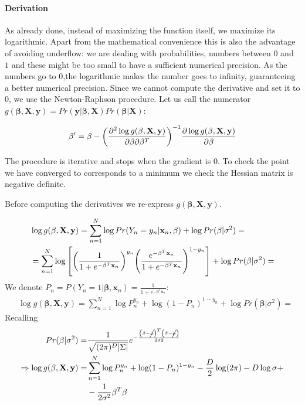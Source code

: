 \documentclass[12pt, letterpaper]{article}
\theoremstyle{definition}
\newcommand{\X}{\mathrm{\mathbf{X}}}
\newcommand{\y}{\mathbf{y}}
\newcommand{\be}{\mathbf{\beta}}
\newcommand{\x}{\mathbf{x}}
\DeclarePairedDelimiter\autobracket{(}{)}
\newcommand{\br}[1]{\autobracket*{#1}}
\begin{document}
\paragraph{Derivation}
As already done, instead of maximizing the function itself, we maximize its logarithmic. Apart from the mathematical convenience this is also the advantage of avoiding underflow: we are dealing with probabilities, numbers between $0$ and $1$ and these might be too small to have a sufficient numerical precision. As the numbers go to $0$,the logarithmic makes the number goes to infinity, guaranteeing a better numerical precision.
 Since we cannot compute the derivative and set it to $0$, we use the Newton-Raphson procedure. Let us call the numerator $g(\be,\X,\y) = Pr(\y|\be,\X)Pr(\be|\X)$:

\begin{equation}
\be' = \be - \br{\frac{\partial^2\log g(\be,\X,\y)}{\partial \be \partial \be^T}}^{-1} \frac{\partial \log g(\be,\X,\y)}{\partial \be}
\end{equation}

The procedure is iterative and stops when the gradient is $0$. To check the point we have converged to corresponds to a minimum we check the Hessian matrix is negative definite.

Before computing the derivatives we re-express $g(\be,\X,\y)$.

\begin{equation}
\begin{aligned}
&\log g(\be,\X,\y) = \sum_{n=1}^N \log Pr(Y_n=y_n|\x_n, \be) + \log Pr(\be|\sigma^2) = \\
&=  \sum_{n=1}^N \log \left[\br{\frac{1}{1+e^{-\be^T\x_n}}}^{y_n} \br{\frac{e^{-\be^T\x_n}}{1+e^{-\be^T\x_n}}}^{1-y_n}\right] + \log Pr(\be|\sigma^2) =
\end{aligned}
\end{equation}
We denote $P_n=P(Y_n=1|\be, \x_n) = \frac{1}{1+e^{-\be^T\x_n}}$:
\begin{equation}
\begin{aligned}
&\log g(\be,\X,\y) =  \sum_{n=1}^N \log P_n^{y_n} +\log(1-P_n)^{1-y_n}+ \log Pr(\be|\sigma^2) =
\end{aligned}
\end{equation}
Recalling
\begin{equation}
\begin{aligned}
Pr(\be|\sigma^2)  =& \frac{1}{\sqrt{(2\pi)^D|\Sigma|}} e^{-\frac{\br{\be-\cancel{\mu}}^T\br{\be-\cancel{\mu}}}{2\sigma2}}\\
\Rightarrow\log g(\be,\X,\y) =&  \sum_{n=1}^N \log P_n^{y_n} +\log(1-P_n)^{1-y_n} -\frac{D}{2}\log(2\pi) - D\log\sigma +\\
&- \frac{1}{2\sigma^2} \be^T\be
\end{aligned}
\end{equation}
\end{document}
